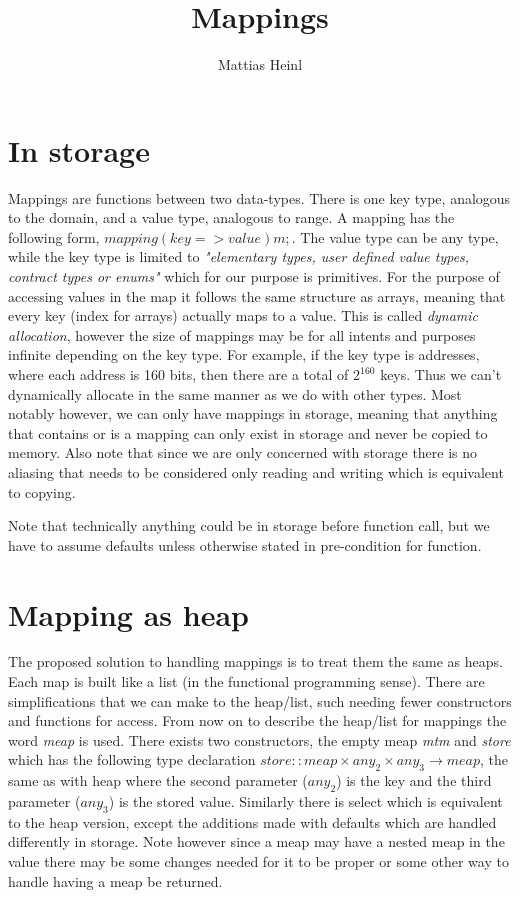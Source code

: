 \documentclass{article}
\title{Mappings}
\author{Mattias Heinl}
\date{}
\begin{document}
	
	\maketitle

	\section{In storage}
	Mappings are functions between two data-types. There is one key type, analogous to the domain, and a value type, analogous to range. A mapping has the following form, $mapping(key => value) m;$. The value type can be any type, while the key type is limited to \textit{"elementary types, user defined value types, contract types or enums"} which for our purpose is primitives. For the purpose of accessing values in the map it follows the same structure as arrays, meaning that every key (index for arrays) actually maps to a value. This is called \textit{dynamic allocation}, however the size of mappings may be for all intents and purposes infinite depending on the key type. For example, if the key type is addresses, where each address is 160 bits, then there are a total of $2^{160}$ keys. Thus we can't dynamically allocate in the same manner as we do with other types. Most notably however, we can only have mappings in storage, meaning that anything that contains or is a mapping can only exist in storage and never be copied to memory. Also note that since we are only concerned with storage there is no aliasing that needs  to be considered only reading and writing which is equivalent to copying. 
	
	Note that technically anything could be in storage before function call, but we have to assume defaults unless otherwise stated in pre-condition for function.
	
	\section{Mapping as heap}
	The proposed solution to handling mappings is to treat them the same as heaps. Each map is built like a list (in the functional programming sense). There are simplifications that we can make to the heap/list, such needing fewer constructors and functions for access. From now on to describe the heap/list for mappings the word \textit{meap} is used. There exists two constructors, the empty meap \textit{mtm} and \textit{store} which has the following type declaration $store:: meap \times any_2 \times any_3 \to meap $, the same as with heap where the second parameter ($any_2$) is the key and the third parameter ($any_3$) is the stored value. Similarly there is select which is equivalent to the heap version, except the additions made with defaults which are handled differently in storage. Note however since a meap may have a nested meap in the value there may be some changes needed for it to be proper or some other way to handle having a meap be returned. 
	
\end{document}
